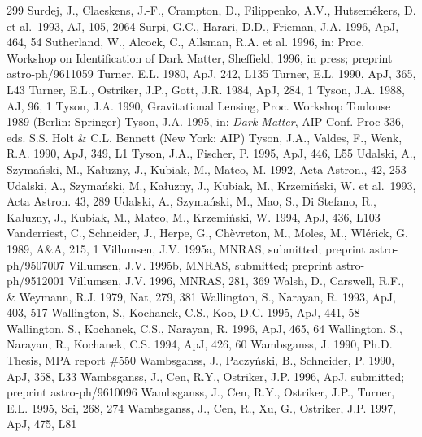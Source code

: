 \documentclass[a4paper,10pt]{article} %
\begin{document}
\begin{thebibliography}{299}
  Surdej, J., Claeskens, J.-F., Crampton, D., Filippenko, A.V.,
  Hutsem\'ekers, D. et al.\ 1993, AJ, 105, 2064
  Surpi, G.C., Harari, D.D., Frieman, J.A. 1996, ApJ, 464, 54
  Sutherland, W., Alcock, C., Allsman, R.A. et al. 1996, in:
  Proc. Workshop on Identification of Dark Matter, Sheffield, 1996, in
  press; preprint astro-ph/9611059
  Turner, E.L. 1980, ApJ, 242, L135
  Turner, E.L. 1990, ApJ, 365, L43
  Turner, E.L., Ostriker, J.P., Gott, J.R. 1984, ApJ, 284, 1
  Tyson, J.A. 1988, AJ, 96, 1
  Tyson, J.A. 1990, Gravitational Lensing, Proc. Workshop Toulouse
  1989 (Berlin: Springer)
  Tyson, J.A. 1995, in: {\em Dark Matter\/}, AIP Conf. Proc 336,
  eds. S.S. Holt \& C.L. Bennett (New York: AIP)
  Tyson, J.A., Valdes, F., Wenk, R.A. 1990, ApJ, 349, L1
  Tyson, J.A., Fischer, P. 1995, ApJ, 446, L55
  Udalski, A., Szyma\'nski, M., Ka{\l}uzny, J., Kubiak, M., Mateo,
  M. 1992, Acta Astron., 42, 253
  Udalski, A., Szyma\'nski, M., Ka{\l}uzny, J., Kubiak, M.,
  Krzemi\'nski, W. et al.\ 1993, Acta Astron. 43, 289
  Udalski, A., Szyma\'nski, M., Mao, S., Di Stefano, R., Ka{\l}uzny,
  J., Kubiak, M., Mateo, M., Krzemi\'nski, W. 1994, ApJ, 436, L103
  Vanderriest, C., Schneider, J., Herpe, G., Ch\`evreton, M., Moles,
  M., Wl\'erick, G. 1989, A\&A, 215, 1
  Villumsen, J.V. 1995a, MNRAS, submitted; preprint astro-ph/9507007
  Villumsen, J.V. 1995b, MNRAS, submitted; preprint astro-ph/9512001
  Villumsen, J.V. 1996, MNRAS, 281, 369
  Walsh, D., Carswell, R.F., \& Weymann, R.J. 1979, Nat, 279, 381
  Wallington, S., Narayan, R. 1993, ApJ, 403, 517
  Wallington, S., Kochanek, C.S., Koo, D.C. 1995, ApJ, 441, 58
  Wallington, S., Kochanek, C.S., Narayan, R. 1996, ApJ, 465, 64
  Wallington, S., Narayan, R., Kochanek, C.S. 1994, ApJ, 426, 60
  Wambsganss, J. 1990, Ph.D. Thesis, MPA report \#550
  Wambsganss, J., Paczy\'nski, B., Schneider, P. 1990, ApJ, 358, L33
  Wambsganss, J., Cen, R.Y., Ostriker, J.P. 1996, ApJ, submitted;
  preprint astro-ph/9610096
  Wambsganss, J., Cen, R.Y., Ostriker, J.P., Turner, E.L. 1995, Sci,
  268, 274
  Wambsganss, J., Cen, R., Xu, G., Ostriker, J.P. 1997, ApJ, 475, L81

\end{thebibliography}
\end{document}
